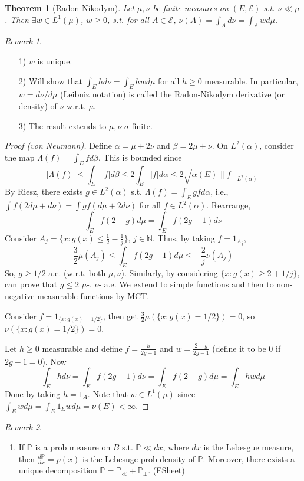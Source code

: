\documentclass{article}
\theoremstyle{definition}
\theoremstyle{remark}
\newtheorem{rem}{Remark}
\theoremstyle{plain}
\newtheorem{thm}[defn]{Theorem}
\newcommand{\NN}{\mathbb{N}}
\newcommand{\PP}{\mathbb{P}}
\begin{document}
\begin{thm}[Radon-Nikodym]
    Let $\mu,\nu$ be finite measures on $(E,\mathcal E)$ s.t. $\nu\ll\mu$. Then $\exists w\in L^1(\mu)$, $w\ge 0$, s.t. for all $A\in\mathcal E$, $\nu(A)=\int_A d\nu=\int_Awd\mu$.
\end{thm}
\begin{rem}\
    \begin{enumerate}
        \item[1)] $w$ is unique.
        \item[2)] Will show that $\int_E hd\nu=\int_E hwd\mu$ for all $h\ge 0$ measurable. In particular, $w=d\nu/d\mu$ (Leibniz notation) is called the Radon-Nikodym derivative (or density) of $\nu$ w.r.t. $\mu$.
        \item[3)] The result extends to $\mu,\nu$ $\sigma$-finite.
    \end{enumerate}
\end{rem}
\begin{proof}[Proof (von Neumann)]
    Define $\alpha=\mu+2\nu$ and $\beta=2\mu+\nu$. On $L^2(\alpha)$, consider the map $\Lambda(f)=\int_Efd\beta$. This is bounded since \[|\Lambda(f)|\le\int_E|f|d\beta\le2\int_E|f|d\alpha\le 2\sqrt{\alpha(E)}\|f\|_{L^2(\alpha)}\]
    By Riesz, there exists $g\in L^2(\alpha)$ s.t. $\Lambda(f)=\int_Egfd\alpha$, i.e., $\int f(2d\mu+d\nu)=\int gf(d\mu+2d\nu)$ for all $f\in L^2(\alpha)$. Rearrange,
    \[\int_Ef(2-g)d\mu=\int_Ef(2g-1)d\nu\]
    Consider $A_j=\{x:g(x)\le\frac{1}{2}-\frac{1}{j}\}$, $j\in\NN$. Thus, by taking $f=1_{A_j}$,
    \[\dfrac32\mu(A_j)\le\int_E f(2g-1)d\mu\le-\dfrac2j\nu(A_j) \]
    So, $g\ge 1/2$ a.e. (w.r.t. both $\mu,\nu$). Similarly, by considering $\{x:g(x)\ge 2+1/j\}$, can prove that $g\le 2$ $\mu$-, $\nu$- a.e. We extend to simple functions and then to non-negative measurable functions by MCT.

    Consider $f=1_{\{x:g(x)=1/2\}}$, then get $\frac{3}{2}\mu(\{x:g(x)=1/2\})=0$, so $\nu(\{x:g(x)=1/2\})=0$.

    Let $h\ge 0$ measurable and define $f=\frac{h}{2g-1}$ and $w=\frac{2-g}{2g-1}$ (define it to be $0$ if $2g-1=0$). Now
    \[\int_E hd\nu=\int_Ef(2g-1)d\nu=\int_Ef(2-g)d\mu=\int_E hwd\mu\]
    Done by taking $h=1_A$. Note that $w\in L^1(\mu)$ since $\int_E wd\mu=\int_E 1_E wd\mu=\nu(E)<\infty$.
\end{proof}

\begin{rem}\
    \begin{enumerate}[1)]
        \item If $\PP$ is a prob measure on $B$ s.t. $\PP\ll dx$, where $dx$ is the Lebesgue measure, then $\frac{d\PP}{dx}=p(x)$ is the Lebesuge prob density of $\PP$. Moreover, there exists a unique decomposition $\PP=\PP_{\ll}+\PP_\perp$. (ESheet)
    \end{enumerate}
\end{rem}
\end{document}
